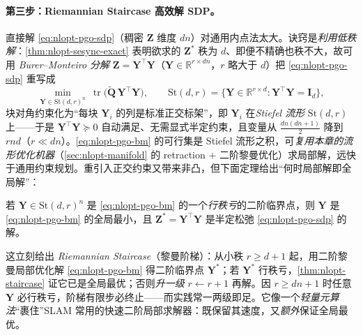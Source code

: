 \paragraph{第三步：Riemannian Staircase 高效解 SDP。}\cite{rosen2019sesync,carlone2026handbook}
直接解 \cref{eq:nlopt-pgo-sdp}（稠密 $\mathbf{Z}$ 维度 $dn$）对通用内点法太大。诀窍是\emph{利用低秩解}：\cref{thm:nlopt-sesync-exact} 表明欲求的 $\mathbf{Z}^*$ 秩为 $d$、即便不精确也秩不大，故可用 \emph{Burer--Monteiro 分解} $\mathbf{Z}=\mathbf{Y}^\top\mathbf{Y}$（$\mathbf{Y}\in\mathbb{R}^{r\times dn}$，$r$ 略大于 $d$）把 \cref{eq:nlopt-pgo-sdp} 重写成
\begin{equation}
  \min_{\mathbf{Y}\in\mathrm{St}(d,r)^n}\ \operatorname{tr}\!\big(\tilde{\mathbf{Q}}\,\mathbf{Y}^\top\mathbf{Y}\big),
  \qquad \mathrm{St}(d,r)=\{\mathbf{Y}\in\mathbb{R}^{r\times d}:\mathbf{Y}^\top\mathbf{Y}=\mathbf{I}_d\},
  \label{eq:nlopt-pgo-bm}
\end{equation}
块对角约束化为“每块 $\mathbf{Y}_i$ 的列是标准正交标架”，即 $\mathbf{Y}_i$ 在\emph{Stiefel 流形} $\mathrm{St}(d,r)$ 上——于是 $\mathbf{Y}^\top\mathbf{Y}\succeq0$ 自动满足、无需显式半定约束，且变量从 $\tfrac{dn(dn+1)}{2}$ 降到 $rnd$（$r\ll dn$）。\cref{eq:nlopt-pgo-bm} 的可行集是 Stiefel 流形之积，可\emph{复用本章的流形优化机器}（\cref{sec:nlopt-manifold} 的 retraction $+$ 二阶黎曼优化）求局部解，远快于通用约束规划。重引入正交约束又带来非凸，但下面定理给出“何时局部解即全局解”：

\begin{theorem}[全局最优的充分条件]\label{thm:nlopt-staircase}
若 $\mathbf{Y}\in\mathrm{St}(d,r)^n$ 是 \cref{eq:nlopt-pgo-bm} 的一个\emph{行秩亏}的二阶临界点，则 $\mathbf{Y}$ 是 \cref{eq:nlopt-pgo-bm} 的全局最小，且 $\mathbf{Z}^*=\mathbf{Y}^\top\mathbf{Y}$ 是半定松弛 \cref{eq:nlopt-pgo-sdp} 的解。
\end{theorem}

\noindent 这立刻给出 \emph{Riemannian Staircase}（黎曼阶梯）：从小秩 $r\ge d{+}1$ 起，用二阶黎曼局部优化解 \cref{eq:nlopt-pgo-bm} 得二阶临界点 $\mathbf{Y}^*$；若 $\mathbf{Y}^*$ 行秩亏，\cref{thm:nlopt-staircase} 证它已是全局最优；否则\emph{升一级} $r\leftarrow r{+}1$ 再解。因 $r\ge dn{+}1$ 时任意 $\mathbf{Y}$ 必行秩亏，阶梯有限步必终止——而实践常一两级即足。它像一个\emph{轻量元算法}“裹住”SLAM 常用的快速二阶局部求解器：既保留其速度，又\emph{额外}保证全局最优。

